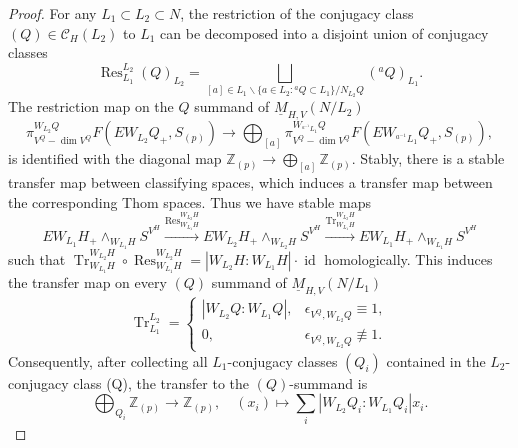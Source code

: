 \documentclass{amsart}
\theoremstyle{plain}
\theoremstyle{definition}
\theoremstyle{remark}
\begin{document}
\begin{proof}
        For any $L_1\subset L_2 \subset N$, the restriction of the conjugacy class $(Q)\in \mathcal{C}_H(L_2)$ to $L_1$ can be decomposed into a disjoint union of conjugacy classes
        \[
        \operatorname{Res}_{L_1}^{L_2}(Q)_{L_2}=\bigsqcup_{[a]\in L_1\backslash\{a\in L_2:{}^a Q\subset L_1\}/N_{L_2}Q }({}^a Q)_{L_1}.
        \]
        The restriction map on the $Q$ summand of $\underline M_{H,V}(N/L_2)$ 
        \[\pi_{V^Q-\dim V^Q}^{W_{L_2} Q} F(EW_{L_2} Q_+, S_{(p)})\to \bigoplus_{[a]}\pi_{V^Q-\dim V^Q}^{W_{{}^{a^{-1}} L_1} Q} F(EW_{{}^{a^{-1}}L_1} Q_+, S_{(p)}),\]
        is identified with the diagonal map $\mathbb Z_{(p)}\to \bigoplus_{[a]}\mathbb Z_{(p)}$.
        Stably, there is a stable transfer map between classifying spaces, which induces a transfer map between the corresponding Thom spaces. Thus we have stable maps
        \[
        EW_{L_1} H_+\wedge_{W_{L_1} H} S^{V^H}\overset{\operatorname{Res}_{W_{L_1} H}^{W_{L_2} H}}{\longrightarrow} EW_{L_2} H_+\wedge_{W_{L_2} H} S^{V^H}\overset{\operatorname{Tr}_{W_{L_1} H}^{W_{L_2} H}}{\longrightarrow} EW_{L_1} H_+\wedge_{W_{L_1} H} S^{V^H}
        \]
        such that $\operatorname{Tr}_{W_{L_1} H}^{W_{L_2} H}\circ \operatorname{Res}_{W_{L_1} H}^{W_{L_2} H}=|W_{L_2} H:W_{L_1} H|\cdot \operatorname{id}$ homologically. This induces the transfer map on every $(Q)$ summand of $\underline M_{H,V}(N/L_1)$
        \[
        \operatorname{Tr}_{L_1}^{L_2}
                =
            \begin{cases}
            |W_{L_2}Q:W_{L_1}Q|,&
            \epsilon_{V^Q,W_{L_2}Q}\equiv 1,\\
            0,&
            \epsilon_{V^Q,W_{L_2}Q}\not\equiv 1.
            \end{cases}
        \]
        Consequently, after collecting all $L_1$-conjugacy classes $(Q_i)$ contained in the $L_2$-conjugacy class (Q), the transfer to the $(Q)$-summand is
        \[\bigoplus_{Q_i} \mathbb{Z}_{(p)}\to \mathbb{Z}_{(p)},\quad (x_i)\mapsto \sum_i |W_{L_2}Q_i:W_{L_1}Q_i|x_i.\]
    \end{proof}
\end{document}
